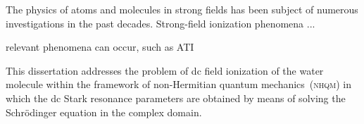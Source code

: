 



The physics of atoms and molecules in strong fields has been subject
of numerous investigations in the past decades. Strong-field
ionization phenomena ...

relevant phenomena can occur, such as ATI




This dissertation addresses the problem of dc field ionization of the
water molecule within the framework of non-Hermitian quantum
mechanics~(\textsc{nhqm}) in which the dc Stark resonance parameters
are obtained by means of solving the Schr\"{o}dinger equation in the
complex domain.



























































